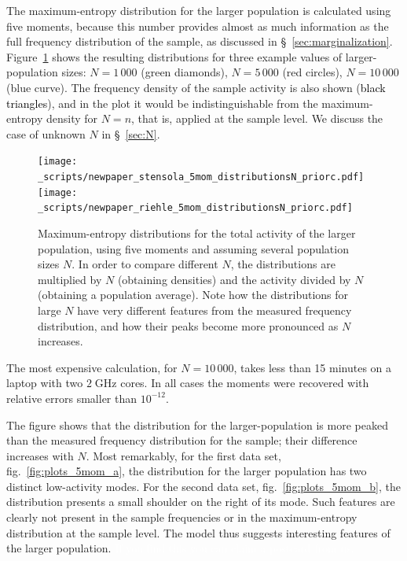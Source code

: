 \documentclass[\ifafour a4paper,12pt,\else a5paper,10pt,\fi%
onecolumn,oneside,article,%
british%
]{memoir}
\theoremstyle{remark}
\theoremstyle{innote}
\renewcommand*{\|}{\nonscript\,\vert\nonscript\;\mathopen{}}
\newcommand*{\sect}{\S}%
\newcommand*{\fig}{fig.}%
\begin{document}
The maximum-entropy distribution for the larger population is calculated
using five moments, because this number provides almost as much information
as the full frequency distribution of the sample, as discussed in
\sect~\ref{sec:marginalization}. Figure~\ref{fig:plots_5mom} shows the
resulting distributions for three example values of
larger-population sizes: $N=1\,000$ (\textcolor{mygreen}{green diamonds}),
$N=5\,000$ (\textcolor{myred}{red circles}), $N=10\,000$
(\textcolor{myblue}{blue curve}). The frequency density of the sample
activity is also shown (\textcolor{black}{black triangles}), and in the
plot it would be indistinguishable from the maximum-entropy density for
$N=n$, that is, applied at the sample level. We discuss the case of unknown
$N$ in \sect~\ref{sec:N}.
\begin{figure}[!p]
  \centering
\subcaption[]{\label{fig:plots_5mom_a}}%
\texttt{[image: \_scripts/newpaper\_stensola\_5mom\_distributionsN\_priorc.pdf]}%
\\[1em]%
\subcaption[]{\label{fig:plots_5mom_b}}%
\texttt{[image: \_scripts/newpaper\_riehle\_5mom\_distributionsN\_priorc.pdf]}%
\\[1em]%
\caption{Maximum-entropy distributions for the total activity of the larger
  population, using five moments and assuming several population sizes $N$.
  In order to compare different $N$, the distributions are multiplied by
  $N$ (obtaining densities) and the activity divided by $N$ (obtaining a
  population average). Note how the distributions for large $N$ have very
  different features from the measured frequency distribution, and how
  their peaks become more pronounced as $N$ increases.}
\label{fig:plots_5mom}
\end{figure}

The most expensive calculation, for $N=10\,000$, takes less than 15 minutes
on a laptop with two $2\;\textrm{GHz}$ cores. In all cases the moments were
recovered with relative errors smaller than $10^{-12}$.

The figure shows that the distribution for the larger-population is more
peaked than the measured frequency distribution for the sample; their
difference increases with $N$. Most remarkably, for the first data set,
\fig~\ref{fig:plots_5mom_a}, the distribution for the larger population has
two distinct low-activity modes. For the second data set,
\fig~\ref{fig:plots_5mom_b}, the distribution presents a small shoulder on
the right of its mode.
Such features are clearly not present in the sample frequencies or in the
maximum-entropy distribution at the sample level. The model thus suggests
interesting features of the larger population. \textcolor{white}{If you
  find this you can claim a postcard from us.}
\end{document}
